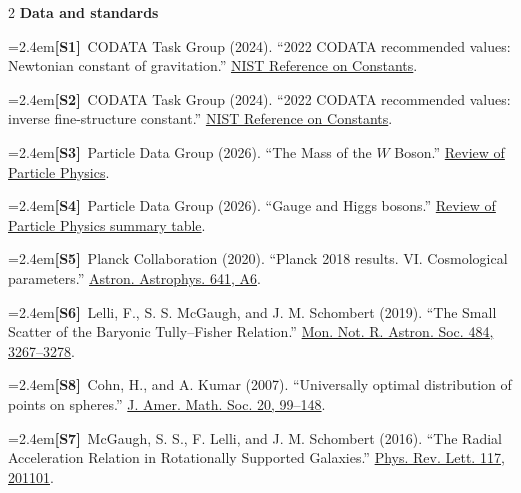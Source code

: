 \documentclass[10pt]{article}
\newcommand{\sect}[1]{\vspace{0.36em}{\large\bfseries\color{pragmaCyanText}#1}\par\vspace{-0.04em}}
\newcommand{\refentry}[2]{\par\noindent\hangindent=2.4em\hangafter=1\textbf{#1}\ #2}
\begin{document}
\vspace{-0.08em}
\sect{References}
{\fontsize{6.9pt}{7.5pt}\selectfont
\setlength{\columnsep}{1.2em}
\begin{multicols}{2}
\raggedcolumns
\textbf{Data and standards}
\refentry{[S1]}{CODATA Task Group (2024). ``2022 CODATA recommended values:
Newtonian constant of gravitation.'' \href{https://physics.nist.gov/cuu/pdf/wall_2022.pdf}{NIST Reference on Constants}.}
\refentry{[S2]}{CODATA Task Group (2024). ``2022 CODATA recommended values:
inverse fine-structure constant.'' \href{https://physics.nist.gov/cuu/pdf/wall_2022.pdf}{NIST Reference on Constants}.}
\refentry{[S3]}{Particle Data Group (2026). ``The Mass of the \(W\) Boson.''
\href{https://pdg.lbl.gov/2026/reviews/rpp2026-rev-w-mass.pdf}{Review of Particle Physics}.}
\refentry{[S4]}{Particle Data Group (2026). ``Gauge and Higgs bosons.''
\href{https://pdg.lbl.gov/2026/tables/rpp2026-sum-gauge-higgs-bosons.pdf}{Review of Particle Physics summary table}.}
\refentry{[S5]}{Planck Collaboration (2020). ``Planck 2018 results. VI.
Cosmological parameters.'' \href{https://arxiv.org/abs/1807.06209}{Astron. Astrophys. 641, A6}.}
\refentry{[S6]}{Lelli, F., S. S. McGaugh, and J. M. Schombert (2019).
``The Small Scatter of the Baryonic Tully--Fisher Relation.''
\href{https://arxiv.org/abs/1901.05966}{Mon. Not. R. Astron. Soc. 484, 3267--3278}.}
\refentry{[S8]}{Cohn, H., and A. Kumar (2007). ``Universally optimal
distribution of points on spheres.''
\href{https://arxiv.org/abs/math/0607446}{J. Amer. Math. Soc. 20, 99--148}.}
\refentry{[S7]}{McGaugh, S. S., F. Lelli, and J. M. Schombert (2016).
``The Radial Acceleration Relation in Rotationally Supported Galaxies.''
\href{https://arxiv.org/abs/1609.05917}{Phys. Rev. Lett. 117, 201101}.}


\end{multicols}}
\end{document}
